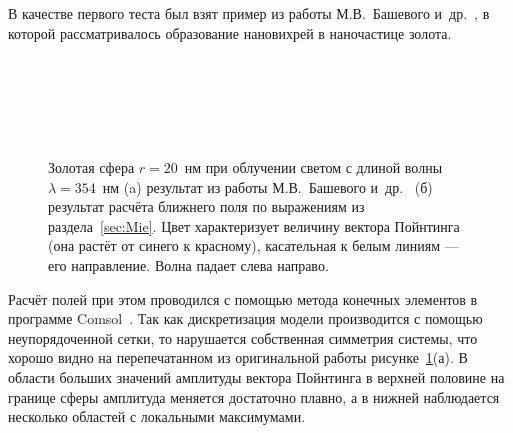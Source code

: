 В качестве первого теста был взят пример из работы М.В.~Башевого
и~др.~\cite{Bashevoy-2005}, в которой рассматривалось образование
нановихрей в наночастице золота. 
\begin{figure}[p]
  \begin{minipage}[ht]{0.99\linewidth}
  \end{minipage}\\
  \vfill
  \begin{minipage}[ht]{0.99\linewidth}
  \end{minipage}\\
  \vfill
  \begin{minipage}[ht]{0.99\linewidth}
  \end{minipage}\\
  \begin{minipage}[ht]{0.99\linewidth}
  \end{minipage}
  \caption{Золотая сфера $r=20$~нм при облучении светом с длиной волны
    $\lambda=354$~нм (a) результат из работы М.В.~Башевого
    и~др.~\cite{Bashevoy-2005} (б) результат расчёта ближнего поля по
    выражениям из раздела~\ref{sec:Mie}. Цвет характеризует величину
    вектора Пойнтинга (она растёт от синего к красному), касательная к
    белым линиям --- его направление. Волна падает слева
    направо.\label{img:vortex}}
\end{figure}
Расчёт полей при этом проводился с помощью метода конечных элементов в
программе Comsol~\cite{Comsol-web}. Так как дискретизация модели производится с помощью
неупорядоченной сетки, то нарушается собственная симметрия системы,
что хорошо видно на перепечатанном из оригинальной работы
рисунке~\ref{img:vortex}(а).  В области больших значений амплитуды
вектора Пойнтинга в верхней половине на границе сферы амплитуда
меняется достаточно плавно, а в нижней наблюдается несколько областей
с локальными максимумами.

